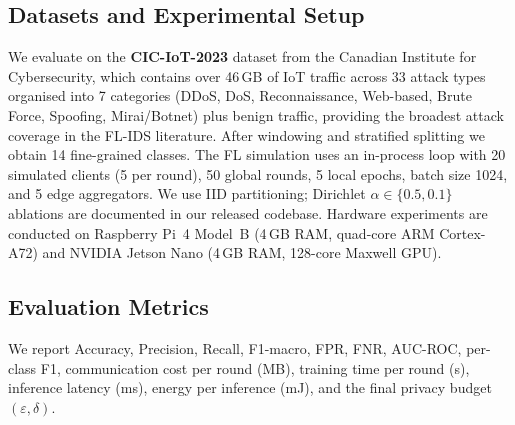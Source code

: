 \documentclass[conference]{IEEEtran}
\newcommand{\eps}{\varepsilon}
\begin{document}
\subsection{Datasets and Experimental Setup}
We evaluate on the \textbf{CIC-IoT-2023} dataset from the Canadian
Institute for Cybersecurity, which contains over 46\,GB of IoT traffic
across 33 attack types organised into 7 categories (DDoS, DoS,
Reconnaissance, Web-based, Brute Force, Spoofing, Mirai/Botnet) plus
benign traffic, providing the broadest attack coverage in the FL-IDS
literature. After windowing and stratified splitting we obtain 14
fine-grained classes. The FL simulation uses an in-process loop with
20 simulated clients (5 per round), 50 global rounds, 5 local epochs,
batch size 1024, and 5 edge aggregators. We use IID partitioning;
Dirichlet $\alpha\!\in\!\{0.5,0.1\}$ ablations are documented in our
released codebase. Hardware experiments are conducted on Raspberry
Pi~4 Model~B (4\,GB RAM, quad-core ARM Cortex-A72) and NVIDIA Jetson
Nano (4\,GB RAM, 128-core Maxwell GPU).

\subsection{Evaluation Metrics}
We report Accuracy, Precision, Recall, F1-macro, FPR, FNR, AUC-ROC,
per-class F1, communication cost per round (MB), training time per
round (s), inference latency (ms), energy per inference (mJ), and the
final privacy budget $(\eps,\delta)$.

\end{document}
